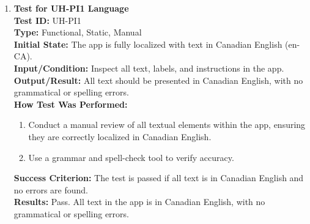 \documentclass[12pt, titlepage]{article}
\begin{document}
\begin{enumerate}
    \item \textbf{Test for UH-PI1 Language} \\
      \newline
      \textbf{Test ID:} UH-PI1 \\
      \textbf{Type:} Functional, Static, Manual \\
      \textbf{Initial State:} The app is fully localized with text in Canadian English (en-CA). \\
      \textbf{Input/Condition:} Inspect all text, labels, and instructions in the app. \\
      \textbf{Output/Result:} All text should be presented in Canadian English, with no grammatical or spelling errors. \\
      \textbf{How Test Was Performed:}
      \begin{enumerate}
          \item Conduct a manual review of all textual elements within the app, ensuring they are correctly localized in Canadian 
          English.
          \item Use a grammar and spell-check tool to verify accuracy.
      \end{enumerate}
      \textbf{Success Criterion:} The test is passed if all text is in Canadian English and no errors are found.\\
      \textbf{Results:} Pass. All text in the app is in Canadian English, with no grammatical or spelling errors.\\


\end{enumerate}
\end{document}
